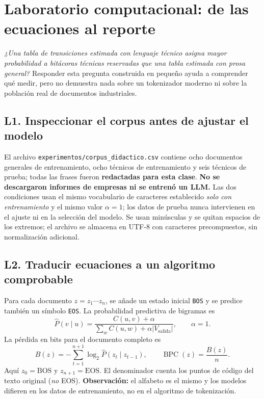 
\chapter*{Laboratorio computacional: de las ecuaciones al reporte}
\label{lab:comp}
\begin{idea}
\emph{¿Una tabla de transiciones estimada con lenguaje técnico asigna mayor
probabilidad a bitácoras técnicas reservadas que una tabla estimada con prosa general?}
Responder esta pregunta construida en pequeño ayuda a comprender qué medir,
pero no demuestra nada sobre un tokenizador moderno ni sobre la población real
de documentos industriales.
\end{idea}
\section*{L1. Inspeccionar el corpus antes de ajustar el modelo}
El archivo \nolinkurl{experimentos/corpus_didactico.csv} contiene ocho documentos
generales de entrenamiento, ocho técnicos de entrenamiento y seis técnicos
de prueba; todas las frases fueron \textbf{redactadas para esta clase}.
\textbf{No se descargaron informes de empresas ni se entrenó un LLM.}
Las dos condiciones usan el mismo vocabulario de caracteres establecido
\emph{solo con entrenamiento} y el mismo valor $\alpha=1$; los datos
de prueba nunca intervienen en el ajuste ni en la selección del modelo.
Se usan minúsculas y se quitan espacios de los extremos; el archivo se almacena
en UTF-8 con caracteres precompuestos, sin normalización adicional.

\section*{L2. Traducir ecuaciones a un algoritmo comprobable}
Para cada documento $z=z_1\cdots z_n$, se añade un estado inicial
\texttt{BOS} y se predice también un símbolo \texttt{EOS}. La probabilidad
predictiva de bigramas es
\[
\widehat P(v\mid u)=\frac{C(u,v)+\alpha}
{\sum_w C(u,w)+\alpha|V_{\mathrm{salida}}|},\qquad \alpha=1.
\]
La pérdida en bits para el documento completo es
\[
B(z)=-\sum_{t=1}^{n+1}\log_2 \widehat P(z_t\mid z_{t-1}),
\qquad \operatorname{BPC}(z)=\frac{B(z)}{n}.
\]
Aquí $z_0=\mathrm{BOS}$ y $z_{n+1}=\mathrm{EOS}$. El denominador
cuenta los puntos de código del texto original (\emph{no} EOS).
\textbf{Observación:} el alfabeto es el mismo y los modelos difieren en
los datos de entrenamiento, no en el algoritmo de tokenización.

